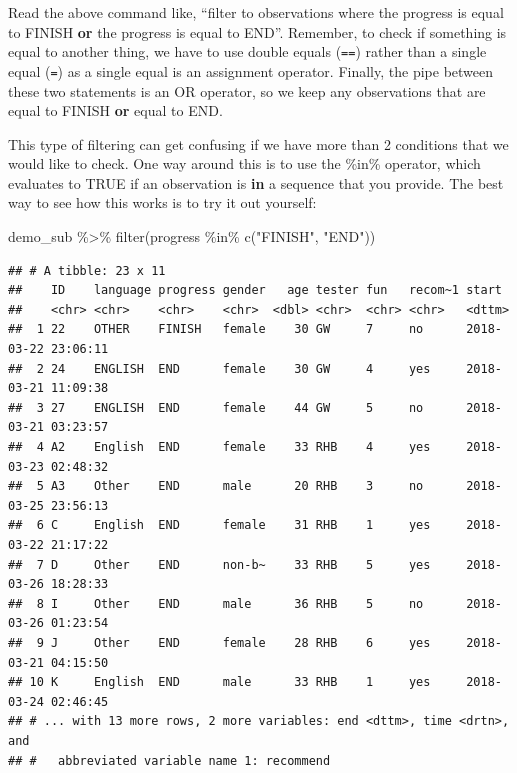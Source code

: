 \documentclass[
]{book}
\newenvironment{Shaded}{\begin{snugshade}}{\end{snugshade}}
\newcommand{\FunctionTok}[1]{\textcolor[rgb]{0.00,0.00,0.00}{#1}}
\newcommand{\NormalTok}[1]{#1}
\newcommand{\SpecialCharTok}[1]{\textcolor[rgb]{0.00,0.00,0.00}{#1}}
\newcommand{\StringTok}[1]{\textcolor[rgb]{0.31,0.60,0.02}{#1}}
\begin{document}
Read the above command like, ``filter to observations where the progress is equal to FINISH \textbf{or} the progress is equal to END''. Remember, to check if something is equal to another thing, we have to use double equals (\texttt{==}) rather than a single equal (\texttt{=}) as a single equal is an assignment operator. Finally, the pipe between these two statements is an OR operator, so we keep any observations that are equal to FINISH \textbf{or} equal to END.

This type of filtering can get confusing if we have more than 2 conditions that we would like to check. One way around this is to use the \%in\% operator, which evaluates to TRUE if an observation is \textbf{in} a sequence that you provide. The best way to see how this works is to try it out yourself:

\begin{Shaded}
\begin{Highlighting}[]
\NormalTok{demo\_sub }\SpecialCharTok{\%\textgreater{}\%} \FunctionTok{filter}\NormalTok{(progress }\SpecialCharTok{\%in\%} \FunctionTok{c}\NormalTok{(}\StringTok{"FINISH"}\NormalTok{, }\StringTok{"END"}\NormalTok{))}
\end{Highlighting}
\end{Shaded}

\begin{verbatim}
## # A tibble: 23 x 11
##    ID    language progress gender   age tester fun   recom~1 start              
##    <chr> <chr>    <chr>    <chr>  <dbl> <chr>  <chr> <chr>   <dttm>             
##  1 22    OTHER    FINISH   female    30 GW     7     no      2018-03-22 23:06:11
##  2 24    ENGLISH  END      female    30 GW     4     yes     2018-03-21 11:09:38
##  3 27    ENGLISH  END      female    44 GW     5     no      2018-03-21 03:23:57
##  4 A2    English  END      female    33 RHB    4     yes     2018-03-23 02:48:32
##  5 A3    Other    END      male      20 RHB    3     no      2018-03-25 23:56:13
##  6 C     English  END      female    31 RHB    1     yes     2018-03-22 21:17:22
##  7 D     Other    END      non-b~    33 RHB    5     yes     2018-03-26 18:28:33
##  8 I     Other    END      male      36 RHB    5     no      2018-03-26 01:23:54
##  9 J     Other    END      female    28 RHB    6     yes     2018-03-21 04:15:50
## 10 K     English  END      male      33 RHB    1     yes     2018-03-24 02:46:45
## # ... with 13 more rows, 2 more variables: end <dttm>, time <drtn>, and
## #   abbreviated variable name 1: recommend
\end{verbatim}
\end{document}
